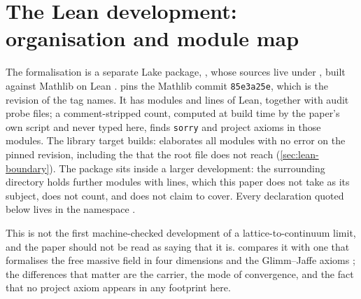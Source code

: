 %
%
\section{The Lean development: organisation and module map}
\label{sec:lean-overview}

The formalisation is a separate Lake package, , whose
sources live under , built against Mathlib on
Lean \LeanToolchain{}.  pins the Mathlib commit
\texttt{85e3a25e}, which is the revision of the tag  names. It has
\NumCleanModules{} modules and
\NumCleanLines{} lines of Lean, together with \NumAuditProbes{} audit probe
files; a comment-stripped count, computed at build time by the paper's own
script and never typed here, finds \NumCleanSorry{} \texttt{sorry} and
\NumCleanProjectAxioms{} project axioms in those modules. The library target
builds:  elaborates all \NumCleanModules{}
modules with no error on the pinned revision, including the
\NumUnreachableModules{} that the root file does not reach
(\cref{sec:lean-boundary}).  The package sits
inside a larger development: the surrounding directory
 holds \NumRootFiles{} further modules with
\NumRootLines{} lines, which this paper does not take as its subject, does not count, and does
not claim to cover.  Every declaration quoted below lives in the namespace
.

This is not the first machine-checked development of a lattice-to-continuum
limit, and the paper should not be read as saying that it is.  
compares it with one that formalises the free massive field in four dimensions
and the Glimm--Jaffe axioms \cite{douglas2026}; the differences that matter are
the carrier, the mode of convergence, and the fact that no project axiom appears
in any footprint here.

